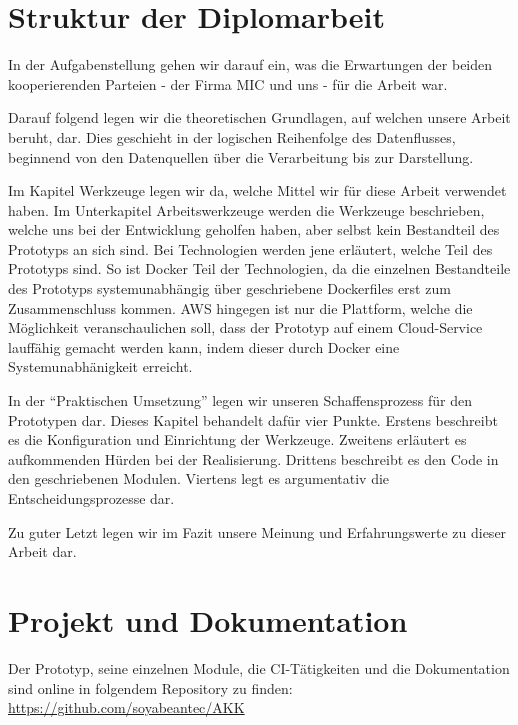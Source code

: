 \section{Struktur der Diplomarbeit}
In der Aufgabenstellung gehen wir darauf ein, was die Erwartungen der beiden kooperierenden Parteien - der Firma MIC und uns - für die Arbeit war.
\vspace{5mm}\par
Darauf folgend legen wir die theoretischen Grundlagen, auf welchen unsere Arbeit beruht, dar.
Dies geschieht in der logischen Reihenfolge des Datenflusses, beginnend von den Datenquellen über die Verarbeitung bis zur Darstellung.
\vspace{5mm}\par
Im Kapitel Werkzeuge legen wir da, welche Mittel wir für diese Arbeit verwendet haben. Im Unterkapitel Arbeitswerkzeuge werden die Werkzeuge beschrieben, welche uns bei der Entwicklung geholfen haben, aber selbst kein Bestandteil des Prototyps an sich sind. Bei Technologien werden jene erläutert, welche Teil des Prototyps sind. So ist Docker Teil der Technologien, da die einzelnen Bestandteile des Prototyps systemunabhängig über geschriebene Dockerfiles erst zum Zusammenschluss kommen. AWS hingegen ist nur die Plattform, welche die Möglichkeit veranschaulichen soll, dass der Prototyp auf einem Cloud-Service lauffähig gemacht werden kann, indem dieser durch Docker eine Systemunabhänigkeit erreicht.
\vspace{5mm}\par
In der “Praktischen Umsetzung” legen wir unseren Schaffensprozess für den Prototypen dar. 
Dieses Kapitel behandelt dafür vier Punkte. Erstens beschreibt es die Konfiguration und Einrichtung der Werkzeuge. Zweitens erläutert es aufkommenden Hürden bei der Realisierung. Drittens beschreibt es den Code in den geschriebenen Modulen. Viertens legt es argumentativ die Entscheidungsprozesse dar.
\vspace{5mm}\par
Zu guter Letzt legen wir im Fazit unsere Meinung und Erfahrungswerte zu dieser Arbeit dar.

\section{Projekt und Dokumentation}
Der Prototyp, seine einzelnen Module, die CI-Tätigkeiten und die Dokumentation sind online in folgendem Repository zu finden:
\href{https://github.com/soyabeantec/AKK}{https://github.com/soyabeantec/AKK}